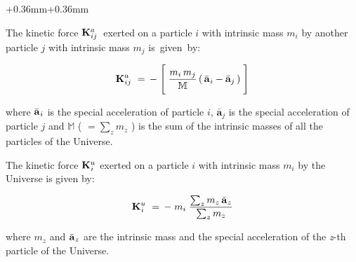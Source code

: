 \documentclass[10pt,fleqn]{article}
\begin{document}
\begin{adjustwidth}{+0.36mm}{+0.36mm}

\par {}

\bigskip \smallskip

\noindent The kinetic force \hbox {$\mathbf{K}^{a}_{\hspace{+0.012em}ij}$ exerted} on a particle $i$ with intrinsic mass $m_i$ by another particle $j$ with intrinsic mass $m_j$ \hbox {is given by}:
\par \vspace{-0.30em}
\begin{eqnarray*}
\mathbf{K}^{a}_{\hspace{+0.012em}ij} ~=\, - \; \Bigg [ \; \dfrac{m_i \, m_j}{\mathbb{M}} \, ( \, \bar{\mathbf{a}}_{\hspace{+0.045em}i} - \bar{\mathbf{a}}_{j} \, ) \; \Bigg ]
\end{eqnarray*}
\par \vspace{+0.90em}
\noindent where $\bar{\mathbf{a}}_{\hspace{+0.045em}i}$ is the special acceleration of particle $i$, $\bar{\mathbf{a}}_{j}$ is the special acceleration of particle $j$ and $\mathbb{M}$ {\small ( $ = \sum_z m_z$ )} is the sum of the intrinsic masses of all the particles of the Universe.
\par \vspace{+0.60em}
\noindent The kinetic force $\mathbf{K}^{u}_{\hspace{+0.030em}i}$ exerted on a particle $i$ with intrinsic mass $m_i$ by the Universe is given by:
\par \vspace{-0.30em}
\begin{eqnarray*}
\mathbf{K}^{u}_{\hspace{+0.030em}i} ~=\, - \; m_i \; \dfrac{\sum_z m_z \, \bar{\mathbf{a}}_{\hspace{+0.045em}z}}{\sum_z m_z}
\end{eqnarray*}
\par \vspace{+0.90em}
\noindent where $m_z$ and $\bar{\mathbf{a}}_{\hspace{+0.045em}z}$ are the intrinsic mass and the special acceleration of the \textit{z}-th particle of the Universe.

\end{adjustwidth}
\end{document}
